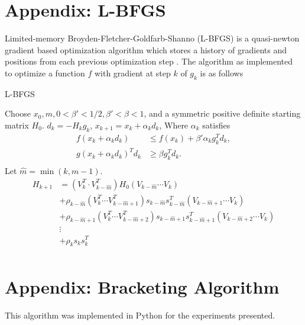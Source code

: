\section{Appendix: L-BFGS}\label{appa}
Limited-memory Broyden-Fletcher-Goldfarb-Shanno (L-BFGS)
is a quasi-newton gradient based optimization algorithm which stores a history of gradients and positions from each previous optimization step \cite{liu1989limited}. The algorithm as implemented to optimize a function $f$ with gradient at step $k$ of $g_k$ is as follows

\begin{algorithm}[H]{L-BFGS}
\begin{algorithmic}
\State Choose $x_0, m, 0 < \beta' < 1/2, \beta' < \beta < 1$, and a symmetric positive definite starting matrix $H_0$. 
\State $d_k = -H_kg_k$,
\State $x_{k+1} = x_k + \alpha_kd_k$,
Where $\alpha_k$ satisfies 
\begin{align*}
    f(x_k + \alpha_k d_k) &\leq f(x_k) + \beta'\alpha_kg_k^Td_k,\\
    g(x_k + \alpha_k d_k)^Td_k &\geq \beta g_{k}^T d_k.\\
\end{align*}
\State Let $\hat m = \min(k, m - 1).$ 
\begin{align*}
    H_{k+1} &= (V_k^T \cdot V_{k-\hat m}^T)H_0(V_{k - \hat m}\cdots V_k)\\
    &+\rho_{k-\hat m}(V_k^T \cdots V_{k-\hat m+1}^T)s_{k - \hat m} s_{k - \hat m}^T(V_{k-\hat m+1} \cdots V_k)\\
    &+\rho_{k-\hat m + 1}(V_k^T \cdots V_{k-\hat m+2}^T)s_{k - \hat m + 1} s_{k - \hat m + 1}^T(V_{k-\hat m+2} \cdots V_k)\\
    & \vdots\\
    &+\rho_ks_ks_k^T\\
\end{align*}
\EndFor
\EndFor
\end{algorithmic}
\end{algorithm}

\newpage
\section{Appendix: Bracketing Algorithm}\label{bracketing}
This algorithm was implemented in Python for the experiments presented. 

